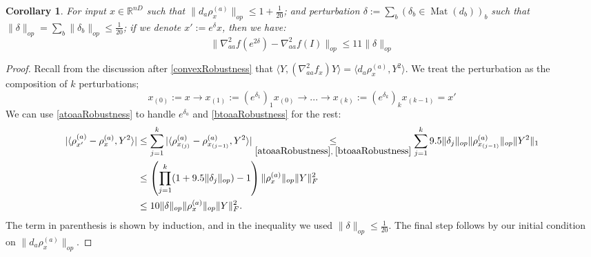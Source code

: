 \documentclass[aos]{imsart}
\newtheorem{corollary}[theorem]{Corollary}
\theoremstyle{definition}
\numberwithin{equation}{section}
\DeclareMathOperator{\Mat}{Mat}
\newcommand{\R}{{\mathbb{R}}}
\newcommand{\samp}{x}
\newcommand{\CF}[1]{{\color{purple}[CF: #1]}}
\begin{document}
\begin{appendix}
\begin{corollary} \label{diagRobustness}
For input $\samp \in \R^{nD}$ such that $\|d_{a} \rho_{\samp}^{(a)}\|_{op} \leq 1 + \frac{1}{20}$; and perturbation $\delta := \sum_{b} (\delta_{b} \in \Mat(d_{b}))_{b}$ such that $\|\delta\|_{op} = \sum_{b} \|\delta_{b}\|_{op} \leq \frac{1}{20}$; if we denote $\samp' := e^{\delta} \samp$, then we have:
\[ \|\nabla^{2}_{aa} f(e^{2\delta}) - \nabla^{2}_{aa} f(I)\|_{op} \leq 11 \|\delta\|_{op}     \]
\end{corollary}
\begin{proof}
Recall from the discussion after \cref{convexRobustness} that $\langle Y, (\nabla^{2}_{aa} f_{\samp}) Y \rangle = \langle d_{a} \rho_{\samp}^{(a)}, Y^{2} \rangle$. We treat the perturbation as the composition of $k$ perturbations;
\[ \samp_{(0)}:=\samp \to \samp_{(1)}:= (e^{\delta_{1}})_1 \samp_{(0)} \to ... \to \samp_{(k)}:=(e^{\delta_{k}})_{k} \samp_{(k-1)} = \samp'  \]
We can use \cref{atoaaRobustness} to handle $e^{\delta_{a}}$ and \cref{btoaaRobustness} for the rest:
\begin{align*}
 |\langle \rho_{\samp'}^{(a)} - \rho_{\samp}^{(a)}, Y^{2} \rangle|
 &\leq \sum_{j=1}^{k} |\langle \rho_{\samp_{(j)}}^{(a)} - \rho_{\samp_{(j-1)}}^{(a)}, Y^{2} \rangle| \underset{\cref{atoaaRobustness},\;\cref{btoaaRobustness}}{\leq} \sum_{j=1}^{k}  9.5 \|\delta_{j}\|_{op} \|\rho_{\samp_{(j-1)}}^{(a)}\|_{op} \|Y^{2}\|_{1} \\
& \leq \left( \prod_{j=1}^k (1+9.5 \|\delta_{j}\|_{op}) - 1 \right) \|\rho_{\samp}^{(a)}\|_{op} \|Y\|_{F}^{2} \\
&\leq 10 \|\delta\|_{op} \|\rho_{\samp}^{(a)}\|_{op} \|Y\|_{F}^{2}.   \end{align*}
The term in parenthesis is shown by induction, and in the inequality we used $\|\delta\|_{op} \leq \frac{1}{20}$. The final step follows by our initial condition on $\|d_{a} \rho_{\samp}^{(a)}\|_{op}$.
\end{proof}


\end{appendix}
\end{document}

